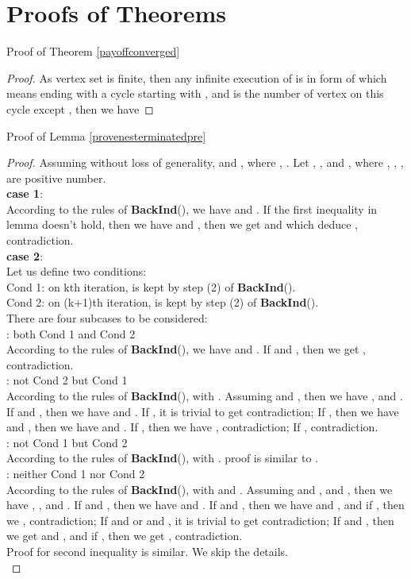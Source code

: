 \documentclass{acm_proc_article-sp}
\begin{document}



\newpage
\appendix

\section{Proofs of Theorems}
Proof of Theorem \ref{payoffconverged}
\begin{proof}
As vertex set  is finite, then any infinite execution  of  is in form of  which means ending with a cycle starting with , and  is the number of vertex on this cycle except , then we have

\end{proof}
Proof of Lemma \ref{provenesterminatedpre}
\begin{proof}
Assuming without loss of generality,  and , where , . Let , ,  and , where , , ,  are positive number.\\
\textbf{case 1}: \\
According to the rules of \textbf{BackInd}(), we have  and . If the first inequality in lemma doesn't hold, then we have  and , then we get  and  which deduce , contradiction.\\
\textbf{case 2}: \\
Let us define two conditions:\\
Cond 1: on kth iteration,  is kept by step (2) of \textbf{BackInd}(). \\
Cond 2: on (k+1)th iteration,  is kept by step (2) of \textbf{BackInd}().\\
There are four subcases to be considered:\\
\textbf{}: both Cond 1 and Cond 2\\
According to the rules of \textbf{BackInd}(), we have  and . If  and , then we get , contradiction. \\
\textbf{}: not Cond 2 but Cond 1 \\
According to the rules of \textbf{BackInd}(),  with . Assuming  and , then we have ,  and . If  and , then we have  and . If , it is trivial to get contradiction; If , then we have  and , then we have  and . If , then we have , contradiction; If , contradiction. \\
\textbf{}: not Cond 1 but Cond 2\\
According to the rules of \textbf{BackInd}(),  with . proof is similar to \textbf{}.\\
\textbf{}: neither Cond 1 nor Cond 2\\
According to the rules of \textbf{BackInd}(),  with  and . Assuming  and , and , then we have , ,  and . If  and , then we have  and . If  and , then we have  and , and if , then we , contradiction; If  and  or  and , it is trivial to get contradiction; If  and , then we get  and , and if , then we get , contradiction.\\
Proof for second inequality is similar. We skip the details.\\
\end{proof}
\end{document}
